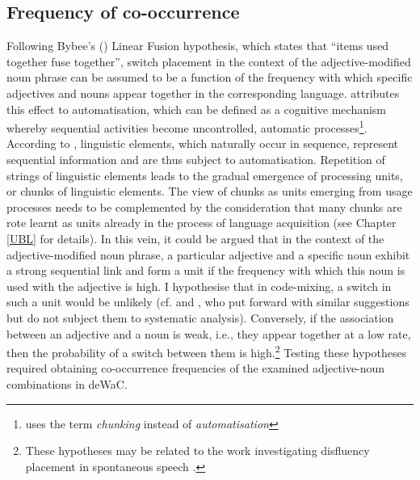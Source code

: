\subsection{Frequency of co-occurrence}
Following Bybee's (\citeyear[112]{bybee-constituency-2002}) Linear Fusion hypothesis, which states that ``items used together fuse together'', switch placement in the context of the adjective-modified noun phrase can be assumed to be a function of the frequency with which specific adjectives and nouns appear together in the corresponding language. \citet{diessel-toappear} attributes this effect to automatisation, which can be defined as a cognitive mechanism whereby sequential activities become uncontrolled, automatic processes\footnote{\citet{bybee-book-2010} uses the term \textit{chunking} instead of \textit{automatisation}}. According to \citet{diessel-toappear}, linguistic elements, which naturally occur in sequence, represent sequential information and are thus subject to automatisation. Repetition of strings of linguistic elements leads to the gradual emergence of processing units, or chunks of linguistic elements.  The view of chunks as units emerging from usage processes needs to be complemented by the consideration that many chunks are rote learnt as units already in the process of language acquisition (see Chapter \ref{UBL} for details). In this vein, it could be argued that in the context of the adjective-modified noun phrase, a particular adjective and a specific noun exhibit a strong sequential link and form a unit if the frequency with which this noun is used with the adjective is high. I hypothesise that in code-mixing, a switch in such a unit would be unlikely (cf. \citealt[125--131]{backus-two-1996} and \citealt[386]{boumans-syntax-1998}, who put forward with similar suggestions but do not subject them to systematic analysis). Conversely, if the association between an adjective and a noun is weak, i.e., they appear together at a low rate, then the probability of a switch between them is high.\footnote{These hypotheses may be related to the work investigating disfluency placement in spontaneous speech \citep[e.g.,][]{schneider2014}.} Testing these hypotheses required obtaining co-occurrence frequencies of the examined adjective-noun combinations in deWaC. 


